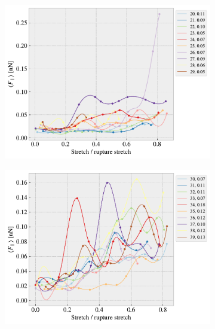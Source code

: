 \begin{figure}[H]
\begin{subfigure}[b]{0.49\textwidth}
        \centering
        \includegraphics[width=\textwidth]{figures/stretch_profiles/RW/SP_2_RW.pdf}
        \caption{}
        \label{fig:}
    \end{subfigure}
    \hfill
    \begin{subfigure}[b]{0.49\textwidth}
        \centering
        \includegraphics[width=\textwidth]{figures/stretch_profiles/RW/SP_3_RW.pdf}
        \caption{}
        \label{fig:}
    \end{subfigure}
    \hfill
    \begin{subfigure}[b]{0.49\textwidth}
        \centering

\end{subfigure}
\end{figure}
